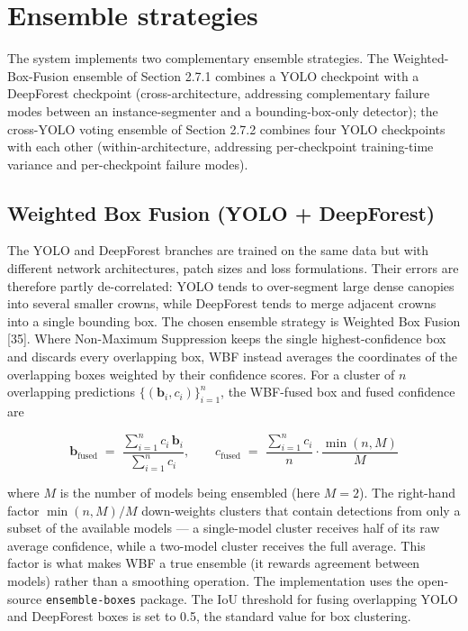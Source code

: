 \section{Ensemble strategies}\label{ensemble-strategies}

The system implements two complementary ensemble strategies. The Weighted-Box-Fusion ensemble of Section 2.7.1 combines a YOLO checkpoint with a DeepForest checkpoint (cross-architecture, addressing complementary failure modes between an instance-segmenter and a bounding-box-only detector); the cross-YOLO voting ensemble of Section 2.7.2 combines four YOLO checkpoints with each other (within-architecture, addressing per-checkpoint training-time variance and per-checkpoint failure modes).

\subsection{Weighted Box Fusion (YOLO + DeepForest)}\label{weighted-box-fusion-yolo-deepforest}

The YOLO and DeepForest branches are trained on the same data but with different network architectures, patch sizes and loss formulations. Their errors are therefore partly de-correlated: YOLO tends to over-segment large dense canopies into several smaller crowns, while DeepForest tends to merge adjacent crowns into a single bounding box. The chosen ensemble strategy is Weighted Box Fusion {[}35{]}. Where Non-Maximum Suppression keeps the single highest-confidence box and discards every overlapping box, WBF instead averages the coordinates of the overlapping boxes weighted by their confidence scores. For a cluster of \(n\) overlapping predictions \(\{(\mathbf{b}_{i}, c_{i})\}_{i=1}^{n}\), the WBF-fused box and fused confidence are

\begin{equation}
\mathbf{b}_{\text{fused}} \;=\; \frac{\sum_{i=1}^{n} c_{i}\, \mathbf{b}_{i}}{\sum_{i=1}^{n} c_{i}}, \qquad
c_{\text{fused}} \;=\; \frac{\sum_{i=1}^{n} c_{i}}{n} \cdot \frac{\min(n, M)}{M}
\end{equation}

where \(M\) is the number of models being ensembled (here \(M = 2\)). The right-hand factor \(\min(n, M)/M\) down-weights clusters that contain detections from only a subset of the available models --- a single-model cluster receives half of its raw average confidence, while a two-model cluster receives the full average. This factor is what makes WBF a true ensemble (it rewards agreement between models) rather than a smoothing operation. The implementation uses the open-source \texttt{ensemble-boxes} package. The IoU threshold for fusing overlapping YOLO and DeepForest boxes is set to 0.5, the standard value for box clustering.

